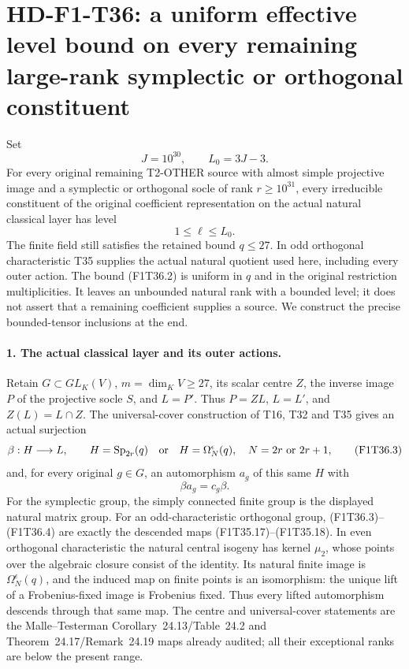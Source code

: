 \section[HD-F1-T36: bounded classical levels on the actual layer]{HD-F1-T36: a uniform effective level bound on every remaining large-rank symplectic or orthogonal constituent}
\label{sec:f1-classical-bounded-level-source-reduction}

Set
\[
                 J=10^{30},\qquad L_0=3J-3.
 \tag{F1T36.1}
\]
For every original remaining T2-OTHER source
with almost simple projective image and a
symplectic or orthogonal socle of rank
\(r\ge10^{31}\), every
irreducible constituent of the original
coefficient representation on the actual
natural classical layer has level
\[
                 \boxed{\quad 1\le\ell\le L_0.\quad}
 \tag{F1T36.2}
\]
The finite field still satisfies the retained
bound \(q\le27\). In odd orthogonal
characteristic T35 supplies the actual
natural quotient used here, including every
outer action. The bound (F1T36.2) is uniform
in \(q\) and in the original restriction
multiplicities. It leaves an unbounded natural
rank with a bounded level; it does not assert
that a remaining coefficient supplies a source.
We construct the precise bounded-tensor
inclusions at the end.

\paragraph{1. The actual classical layer and its outer actions.}
Retain \(G\subset GL_K(V)\),
\(m=\dim_KV\ge27\), its scalar centre \(Z\),
the inverse image \(P\) of the projective
socle \(S\), and \(L=P'\). Thus
\(P=ZL\), \(L=L'\), and \(Z(L)=L\cap Z\).
The universal-cover construction of T16,
T32 and T35 gives an actual surjection
\[
 \beta:H\longrightarrow L,\qquad
 H=\operatorname{Sp}_{2r}(q)
       \quad\hbox{or}\quad
 H=\Omega_N^{\epsilon}(q),
 \quad N=2r\text{ or }2r+1,
 \tag{F1T36.3}
\]
and, for every original \(g\in G\), an
automorphism \(a_g\) of this same \(H\) with
\[
                    \beta a_g=c_g\beta.
 \tag{F1T36.4}
\]
For the symplectic group, the simply connected
finite group is the displayed natural matrix
group. For an odd-characteristic orthogonal
group, (F1T36.3)--(F1T36.4) are exactly the
descended maps (F1T35.17)--(F1T35.18).
In even orthogonal characteristic the natural
central isogeny has kernel \(\mu_2\), whose
points over the algebraic closure consist of
the identity. Its natural finite image is
\(\Omega_N^{\epsilon}(q)\), and the induced
map on finite points is an isomorphism:
the unique lift of a Frobenius-fixed image
is Frobenius fixed. Thus every lifted
automorphism descends through that same
map. The centre and universal-cover
statements are the Malle--Testerman
Corollary~24.13/Table~24.2 and
Theorem~24.17/Remark~24.19 maps already
audited; all their exceptional ranks are
below the present range.

